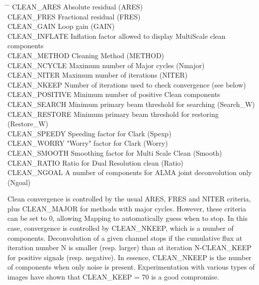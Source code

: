 \documentclass[11pt]{article}
\begin{document}
\begin{tabbing}
\hspace{0.2cm} \= \hspace{4.2cm} \= \kill
\> CLEAN\_ARES  \>  Absolute residual  (ARES) \\
\> CLEAN\_FRES  \>  Fractional residual (FRES) \\
\> CLEAN\_GAIN  \>  Loop gain  (GAIN) \\
\> CLEAN\_INFLATE \> Inflation factor allowed to display MultiScale clean components \\
\> CLEAN\_METHOD \>  Cleaning Method  (METHOD) \\
\> CLEAN\_NCYCLE \>  Maximum number of Major cycles (Nmajor) \\
\> CLEAN\_NITER \>  Maximum number of iterations (NITER) \\
\> CLEAN\_NKEEP \>  Number of iterations used to check convergence (see below)\\
\> CLEAN\_POSITIVE \> Minimum number of positive Clean components \\
\> CLEAN\_SEARCH \>  Minimum primary beam threshold for searching (Search\_W) \\
\> CLEAN\_RESTORE \>  Minimum primary beam threshold for restoring  (Restore\_W) \\
\> CLEAN\_SPEEDY \> Speeding factor for Clark (Spexp) \\
\> CLEAN\_WORRY \> "Worry" factor for Clark (Worry) \\
\> CLEAN\_SMOOTH \> Smoothing factor for Multi Scale Clean (Smooth) \\
\> CLEAN\_RATIO \> Ratio for  Dual Resolution clean (Ratio) \\
\> CLEAN\_NGOAL \> A number of components for ALMA joint deconvolution only (Ngoal)\\
\end{tabbing}

Clean convergence is controlled by the usual ARES, FRES and NITER criteria,
plus CLEAN\_MAJOR for methods with major cycles. However, these criteria
can be set to 0, allowing Mapping to automatically guess when to stop.
In this case, convergence is controlled by CLEAN\_NKEEP, which is 
a number of components. Deconvolution of a given channel stops if
the cumulative flux at iteration number N is smaller (resp. larger) than at iteration
N-CLEAN\_KEEP for positive signals (resp. negative). In essence, CLEAN\_NKEEP
is the number of components when only noise is present. Experimentation
with various types of images have shown that CLEAN\_KEEP = 70 is
a good compromise. 
\end{document}
